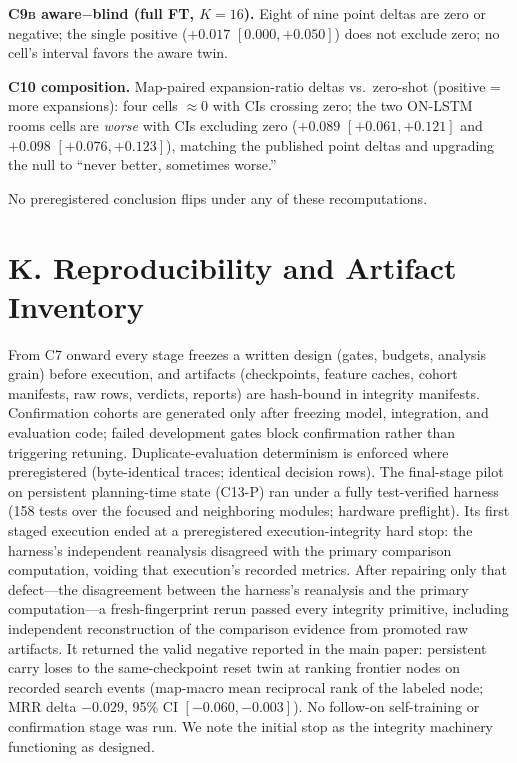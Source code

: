 \documentclass[letterpaper]{article} %
\newcommand{\stage}[1]{\textsc{#1}}
\begin{document}
\textbf{\stage{C9b} aware$-$blind (full FT, $K{=}16$).} Eight of nine point deltas are zero or negative; the single positive ($+0.017$ $[0.000,+0.050]$) does not exclude zero; no cell's interval favors the aware twin.

\textbf{\stage{C10} composition.} Map-paired expansion-ratio deltas vs.\ zero-shot (positive = more expansions): four cells $\approx$0 with CIs crossing zero; the two ON-LSTM rooms cells are \emph{worse} with CIs excluding zero ($+0.089$ $[+0.061,+0.121]$ and $+0.098$ $[+0.076,+0.123]$), matching the published point deltas and upgrading the null to ``never better, sometimes worse.''

No preregistered conclusion flips under any of these recomputations.

\section{K. Reproducibility and Artifact Inventory}

From \stage{C7} onward every stage freezes a written design (gates, budgets, analysis grain) before execution, and artifacts (checkpoints, feature caches, cohort manifests, raw rows, verdicts, reports) are hash-bound in integrity manifests. Confirmation cohorts are generated only after freezing model, integration, and evaluation code; failed development gates block confirmation rather than triggering retuning. Duplicate-evaluation determinism is enforced where preregistered (byte-identical traces; identical decision rows). The final-stage pilot on persistent planning-time state (\stage{C13-P}) ran under a fully test-verified harness (158 tests over the focused and neighboring modules; hardware preflight). Its first staged execution ended at a preregistered execution-integrity hard stop: the harness's independent reanalysis disagreed with the primary comparison computation, voiding that execution's recorded metrics. After repairing only that defect---the disagreement between the harness's reanalysis and the primary computation---a fresh-fingerprint rerun passed every integrity primitive, including independent reconstruction of the comparison evidence from promoted raw artifacts. It returned the valid negative reported in the main paper: persistent carry loses to the same-checkpoint reset twin at ranking frontier nodes on recorded search events (map-macro mean reciprocal rank of the labeled node; MRR delta $-0.029$, 95\% CI $[-0.060,-0.003]$). No follow-on self-training or confirmation stage was run. We note the initial stop as the integrity machinery functioning as designed.
\end{document}

